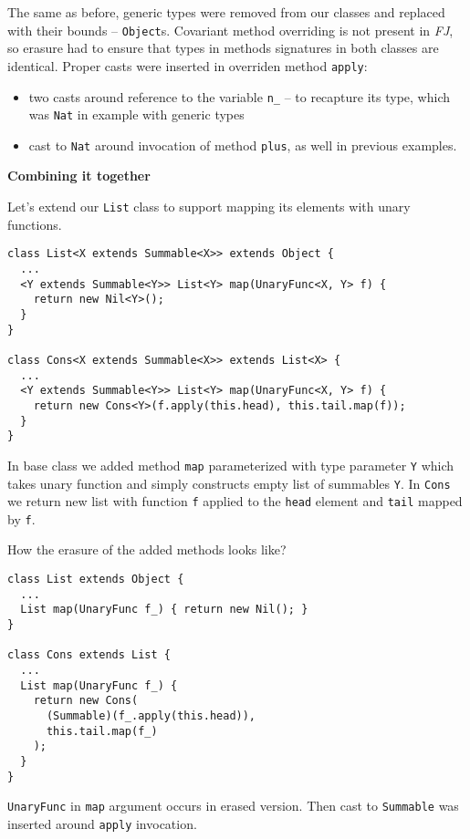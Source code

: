 \documentclass{article}[12pt]
\begin{document}
The same as before, generic types were removed from our classes
and replaced with their bounds -- \texttt{Object}s. Covariant
method overriding is not present in \emph{FJ}, so erasure had
to ensure that types in methods signatures in both classes are
identical. Proper casts were inserted in overriden method
\texttt{apply}:

\begin{itemize}
\item two casts around reference to the variable \texttt{n\_} --
  to recapture its type, which was \texttt{Nat} in example with
  generic types
\item cast to \texttt{Nat} around invocation of method
  \texttt{plus}, as well in previous examples.
\end{itemize}
\textbf{Combining it together}

Let's extend our \texttt{List} class to support mapping its
elements with unary functions.

\begin{verbatim}
class List<X extends Summable<X>> extends Object {
  ...
  <Y extends Summable<Y>> List<Y> map(UnaryFunc<X, Y> f) {
    return new Nil<Y>();
  }
}

class Cons<X extends Summable<X>> extends List<X> {
  ...
  <Y extends Summable<Y>> List<Y> map(UnaryFunc<X, Y> f) {
    return new Cons<Y>(f.apply(this.head), this.tail.map(f));
  }
}
\end{verbatim}

In base class we added method \texttt{map} parameterized with
type parameter \texttt{Y} which takes unary function and simply
constructs empty list of summables \texttt{Y}. In \texttt{Cons}
we return new list with function \texttt{f} applied to the
\texttt{head} element and \texttt{tail} mapped by \texttt{f}.

How the erasure of the added methods looks like?

\begin{verbatim}
class List extends Object {
  ...
  List map(UnaryFunc f_) { return new Nil(); }
}

class Cons extends List {
  ...
  List map(UnaryFunc f_) {
    return new Cons(
      (Summable)(f_.apply(this.head)),
      this.tail.map(f_)
    );     
  }
}
\end{verbatim}

\texttt{UnaryFunc} in \texttt{map} argument occurs in erased
version. Then cast to \texttt{Summable} was inserted around
\texttt{apply} invocation.
\end{document}
